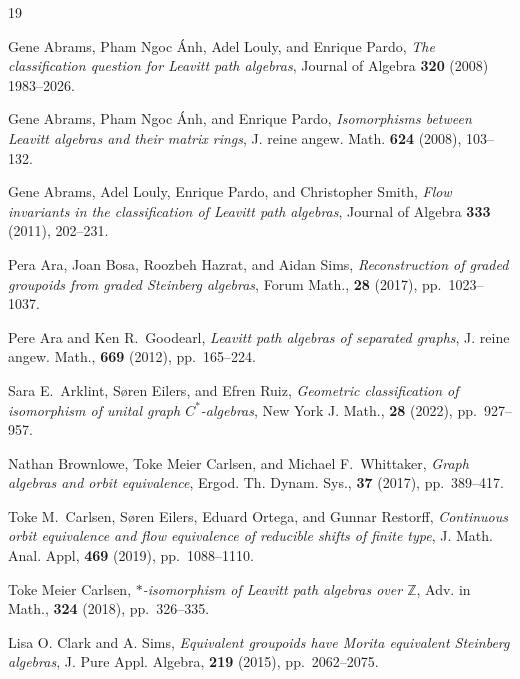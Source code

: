 \documentclass[11pt, letterpaper,final]{amsart}
\theoremstyle{definition}
\theoremstyle{remark}
\begin{document}
\begin{thebibliography}{19}

Gene Abrams, Pham Ngoc \'{A}nh, Adel Louly, and Enrique Pardo, \emph{The classification question for Leavitt path algebras}, Journal of Algebra \textbf{320} (2008) 1983--2026.


 Gene Abrams, Pham Ngoc \'{A}nh, and Enrique Pardo, \emph{Isomorphisms between Leavitt algebras and their matrix rings}, J. reine angew. Math. \textbf{624} (2008), 103--132.



Gene Abrams, Adel Louly, Enrique Pardo, and Christopher Smith, \emph{Flow invariants in the classification of Leavitt path
algebras}, Journal of Algebra \textbf{333} (2011), 202--231.



 Pera Ara, Joan Bosa, Roozbeh Hazrat, and Aidan Sims, \emph{Reconstruction of graded groupoids from graded Steinberg algebras}, Forum Math., \textbf{28} (2017), pp.~1023--1037.

 Pere Ara and Ken R.~Goodearl, \emph{Leavitt path algebras of separated graphs}, J. reine angew. Math., \textbf{669} (2012), pp.~165--224.

 Sara E.~Arklint, S{\o}ren Eilers, and Efren Ruiz, \emph{Geometric classification of isomorphism of unital graph {$C^*$}-algebras}, New York J. Math., \textbf{28} (2022), pp.~927--957.


 Nathan Brownlowe, Toke Meier Carlsen, and Michael F.~Whittaker, \emph{Graph algebras and orbit equivalence}, Ergod. Th. Dynam. Sys., \textbf{37} (2017), pp.~389--417.

 Toke M.~Carlsen, S{\o}ren Eilers, Eduard Ortega, and Gunnar Restorff, \emph{Continuous orbit equivalence and flow equivalence of reducible shifts of finite type}, J. Math. Anal. Appl, \textbf{469} (2019), pp.~1088--1110.

 Toke Meier Carlsen, \emph{$*$-isomorphism of Leavitt path algebras over $\mathbb{Z}$}, Adv. in Math., \textbf{324} (2018), pp.~326--335.


 Lisa O. Clark and A. Sims, \emph{Equivalent groupoids have Morita equivalent Steinberg algebras}, J. Pure
Appl. Algebra, \textbf{219} (2015), pp.~2062--2075.


\end{thebibliography}
\end{document}
